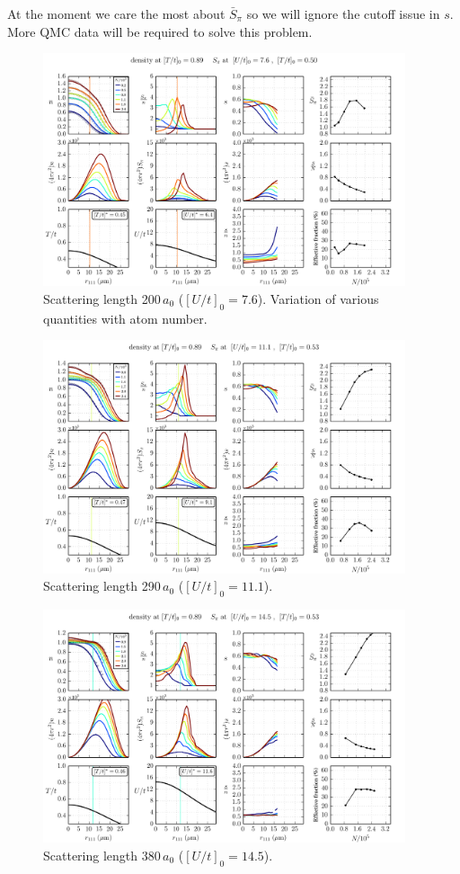 \documentclass[11pt,letter]{article}
\begin{document}
At the moment we care the most about  $\bar{S}_{\pi}$ so we will ignore the
cutoff issue in $s$.  More QMC data will be required to solve this problem.

\begin{figure}[H]
    \centering
\includegraphics[width=0.95\textwidth]{figures/200a0_cold.png}
\caption{Scattering length 200\,$a_{0}$ ($[U/t]_{0}=7.6$).  Variation of
various quantities with atom number. } 
\label{fig:200a0_varyN}
\end{figure}
\begin{figure}[H]
    \centering
\includegraphics[width=0.95\textwidth]{figures/290a0_cold.png}
\caption{Scattering length 290\,$a_{0}$ ($[U/t]_{0}=11.1$).   } 
\label{fig:290a0_varyN}
\end{figure}
\begin{figure}[H]
    \centering
\includegraphics[width=0.95\textwidth]{figures/380a0_cold.png}
\caption{Scattering length 380\,$a_{0}$ ($[U/t]_{0}=14.5$).   } 
\label{fig:380a0_varyN}
\end{figure}
\end{document}
